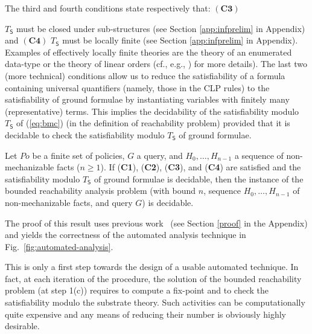 \documentclass[conference]{llncs}
\begin{document}
The third and fourth conditions state  respectively that:  $(\textbf{C3})$ {$T_{\mathsf{S}}$ must be closed under sub-structures (see Section \ref{app:infprelim} in Appendix) and $(\textbf{C4})$
$T_{\mathsf{S}}$ must be {locally finite} (see Section \ref{app:infprelim} in Appendix). 
Examples of effectively locally finite
theories are the theory of an enumerated data-type or the theory of
linear orders (cf., e.g., \cite{jsc-ftp09}) for more details).
The last two (more technical) conditions allow us to reduce the
satisfiability of a formula containing universal quantifiers (namely,
those in the CLP rules) to the satisfiability of ground formulae by
instantiating variables with finitely many (representative) terms.
This implies the decidability of the satisfiability modulo
$T_{\mathsf{S}}$ of (\ref{eq:bmc}) (in the definition of reachability
problem) provided that it is decidable to check the satisfiability
modulo $T_{\mathsf{S}}$ of ground formulae.
\begin{theorem}
\label{thm3}
  Let $\mathit{Po}$ be a finite set of policies, $G$ a query, and
  $H_0,\ldots, H_{n-1}$ a sequence of non-mechanizable facts ($n\geq
  1$).  If (\textbf{C1}), (\textbf{C2}), (\textbf{C3}), and
  (\textbf{C4}) are satisfied and the satisfiability modulo
  $T_{\mathsf{S}}$ of ground formulae is decidable, then the instance
  of the bounded reachability analysis problem (with bound $n$,
  sequence $H_0, \ldots, H_{n-1}$ of non-mechanizable facts, and query
  $G$) is decidable.
\end{theorem}
The proof of this result uses previous work~\cite{jsc-ftp09} (see Section \ref{proof} in the Appendix)
and yields the correctness of the automated analysis technique in
Fig.~\ref{fig:automated-analysis}.  

This is only a first step towards
the design of a usable automated technique.  In fact, at each
iteration of the procedure, the solution of the bounded reachability
problem (at step 1(c)) requires to compute a fix-point and to check
the satisfiability modulo the substrate theory.  Such activities can
be computationally quite expensive and any means of reducing their
number is obviously highly desirable.



}
\end{document}
